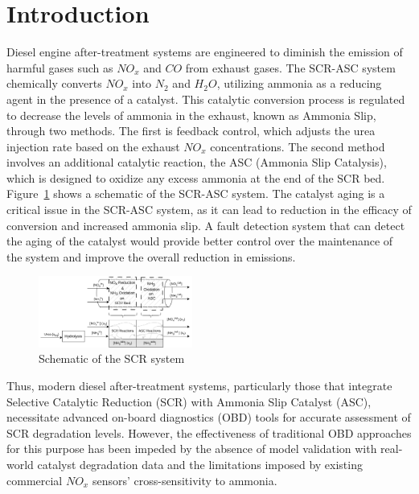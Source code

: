 \section{Introduction}

Diesel engine after-treatment systems are engineered to diminish the emission of
harmful gases such as $NO_x$ and $CO$ from exhaust gases. The SCR-ASC system
chemically converts $NO_x$ into $N_2$ and $H_2O$, utilizing ammonia as a reducing agent
in the presence of a catalyst. This catalytic conversion process is regulated to
decrease the levels of ammonia in the exhaust, known as Ammonia Slip, through
two methods. The first is feedback control, which adjusts the urea injection
rate based on the exhaust $NO_x$ concentrations. The second method involves an
additional catalytic reaction, the ASC (Ammonia Slip Catalysis), which is
designed to oxidize any excess ammonia at the end of the SCR bed.
Figure~\ref{fig:exhaust_scheme} shows a schematic of the SCR-ASC system. The
catalyst aging is a critical issue in the SCR-ASC system, as it can lead to
reduction in the efficacy of conversion and increased ammonia slip. A
fault detection system that can detect the aging of the catalyst would provide
better control over the maintenance of the system and improve the overall
reduction in emissions.

\begin{figure}[ht]
    \centering
    \includegraphics[width=0.45\textwidth]{./figs/scr_sys/SCR-ASC_model.png}
    \caption{Schematic of the SCR system}
    \label{fig:exhaust_scheme}
\end{figure}


Thus, modern diesel after-treatment systems, particularly those that integrate Selective Catalytic Reduction (SCR) with
Ammonia Slip Catalyst (ASC), necessitate advanced on-board diagnostics (OBD) tools for accurate assessment of SCR
degradation levels. However, the effectiveness of traditional OBD approaches for this purpose has been impeded by the
absence of model validation with real-world catalyst degradation data and the limitations imposed by existing commercial
$NO_x$ sensors' cross-sensitivity to ammonia.

